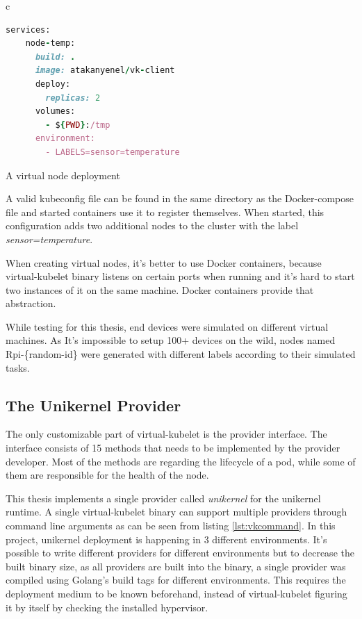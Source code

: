 \begin{code}[htpb]
  \centering
  \begin{tabular}{c}
  \begin{lstlisting}[language=ruby]
    services:
    node-temp:
      build: .
      image: atakanyenel/vk-client
      deploy:
        replicas: 2
      volumes:
        - ${PWD}:/tmp
      environment:
        - LABELS=sensor=temperature
\end{lstlisting}
\end{tabular}
\caption{A virtual node deployment}\label{fig:docker-compose}
\end{code}


A valid kubeconfig file can be found in the same directory as the Docker-compose file and started containers use it to register themselves. When started, this configuration adds two additional nodes to the cluster with the label \textit{sensor=temperature}.

When creating virtual nodes, it's better to use Docker containers, because virtual-kubelet binary listens on certain ports when running and it's hard to start two instances of it on the same machine. Docker containers provide that abstraction.

While testing for this thesis, end devices were simulated on different virtual machines. As It's impossible to setup 100+ devices on the wild, nodes named Rpi-\{random-id\} were generated with different labels according to their simulated tasks.

\subsection{The Unikernel Provider}
The only customizable part of virtual-kubelet is the provider interface. The interface consists of 15 methods that needs to be implemented by the provider developer. Most of the methods are regarding the lifecycle of a pod, while some of them are responsible for the health of the node. 

This thesis implements a single provider called \textit{unikernel} for the unikernel runtime. A single virtual-kubelet binary can support multiple providers through command line arguments as can be seen from listing \ref{lst:vkcommand}. In this project, unikernel deployment is happening in 3 different environments. It's possible to write different providers for different environments but to decrease the built binary size, as all providers are built into the binary, a single provider was compiled using Golang's build tags for different environments. This requires the deployment medium to be known beforehand, instead of virtual-kubelet figuring it by itself by checking the installed hypervisor.

